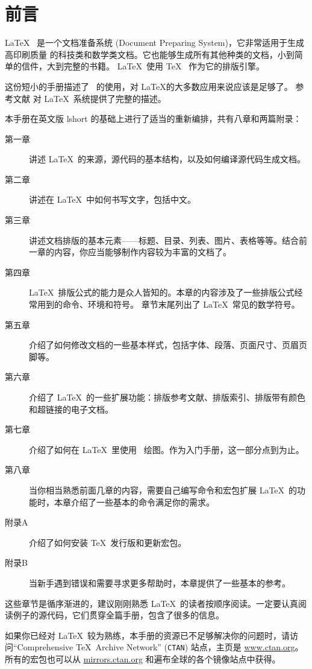 \chapter{前言}

\LaTeX\ \cite{manual} 是一个文档准备系统 (Document Preparing System)，它非常适用于生成高印刷质量
的科技类和数学类文档。它也能够生成所有其他种类的文档，小到简单的信件，大到完整的书籍。
\LaTeX~使用 \TeX\ \cite{texbook} 作为它的排版引擎。

这份短小的手册描述了 \LaTeXe\ 的使用，对 \LaTeX 的大多数应用来说应该是足够了。
参考文献 \cite{manual,companion} 对 \LaTeX\ 系统提供了完整的描述。

\bigskip
本手册在英文版 lshort 的基础上进行了适当的重新编排，共有八章和两篇附录：
\begin{description}
  \item[第一章] 讲述 \LaTeX\ 的来源，源代码的基本结构，以及如何编译源代码生成文档。
  \item[第二章] 讲述在 \LaTeX\ 中如何书写文字，包括中文。
  \item[第三章] 讲述文档排版的基本元素——标题、目录、列表、图片、表格等等。结合前一章的内容，你应当能够制作内容较为丰富的文档了。
  \item[第四章] \LaTeX\ 排版公式的能力是众人皆知的。本章的内容涉及了一些排版公式经常用到的命令、环境和符号。
                章节末尾列出了 \LaTeX\ 常见的数学符号。
  \item[第五章] 介绍了如何修改文档的一些基本样式，包括字体、段落、页面尺寸、页眉页脚等。
  \item[第六章] 介绍了 \LaTeX\ 的一些扩展功能：排版参考文献、排版索引、排版带有颜色和超链接的电子文档。
  \item[第七章] 介绍了如何在 \LaTeX\ 里使用 \TikZ\ 绘图。作为入门手册，这一部分点到为止。
  \item[第八章] 当你相当熟悉前面几章的内容，需要自己编写命令和宏包扩展 \LaTeX\ 的功能时，本章介绍了一些基本的命令满足你的需求。
\end{description}
\begin{description}
  \item[附录A] 介绍了如何安装 \TeX\ 发行版和更新宏包。
  \item[附录B] 当新手遇到错误和需要寻求更多帮助时，本章提供了一些基本的参考。
\end{description}

\bigskip
这些章节是循序渐进的，建议刚刚熟悉 \LaTeX\ 的读者按顺序阅读。一定要认真阅读例子的源代码，它们贯穿全篇手册，包含了很多的信息。

\bigskip
如果你已经对 \LaTeX\ 较为熟练，本手册的资源已不足够解决你的问题时，请访问``Comprehensive
\TeX\ Archive Network'' (\texttt{CTAN}) 站点，主页是 \url{www.ctan.org}。
所有的宏包也可以从 \url{mirrors.ctan.org} 和遍布全球的各个镜像站点中获得。

